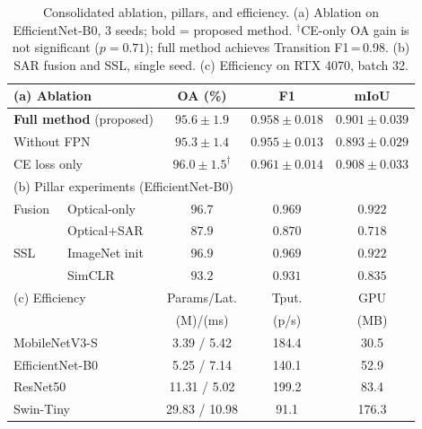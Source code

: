 \documentclass[conference]{IEEEtran}
\begin{document}
\begin{table}[!t]
\centering
\caption{Consolidated ablation, pillars, and efficiency. (a) Ablation on EfficientNet-B0, 3 seeds; bold = proposed method. $^\dagger$CE-only OA gain is not significant ($p{=}0.71$); full method achieves Transition F1\,=\,0.98. (b) SAR fusion and SSL, single seed. (c) Efficiency on RTX 4070, batch 32.}
\label{tab:combined}
\footnotesize
\begin{tabular}{@{}llccc@{}}
\toprule
\multicolumn{2}{l}{(a) Ablation} & OA (\%) & F1 & mIoU\\
\midrule
\multicolumn{2}{l}{\textbf{Full method} (proposed)} & $\mathbf{95.6 \pm 1.9}$ & $\mathbf{0.958 \pm 0.018}$ & $\mathbf{0.901 \pm 0.039}$\\
\multicolumn{2}{l}{Without FPN}        & $95.3 \pm 1.4$ & $0.955 \pm 0.013$ & $0.893 \pm 0.029$\\
\multicolumn{2}{l}{CE loss only}       & $96.0 \pm 1.5^{\dagger}$ & $0.961 \pm 0.014$ & $0.908 \pm 0.033$\\
\midrule
\multicolumn{5}{l}{(b) Pillar experiments (EfficientNet-B0)}\\
Fusion & Optical-only   & $\mathbf{96.7}$ & $\mathbf{0.969}$ & $\mathbf{0.922}$\\
       & Optical+SAR    & $87.9$ & $0.870$ & $0.718$\\
SSL    & ImageNet init  & $\mathbf{96.9}$ & $\mathbf{0.969}$ & $\mathbf{0.922}$\\
       & SimCLR         & $93.2$ & $0.931$ & $0.835$\\
\midrule
\multicolumn{2}{l}{(c) Efficiency} & Params/Lat. & Tput. & GPU\\
\multicolumn{2}{l}{} & (M)/(ms) & (p/s) & (MB)\\
\midrule
\multicolumn{2}{l}{MobileNetV3-S}  & 3.39 / 5.42  & 184.4 & 30.5\\
\multicolumn{2}{l}{EfficientNet-B0}& 5.25 / 7.14  & 140.1 & 52.9\\
\multicolumn{2}{l}{ResNet50}       & 11.31 / 5.02 & 199.2 & 83.4\\
\multicolumn{2}{l}{Swin-Tiny}      & 29.83 / 10.98 & 91.1 & 176.3\\
\bottomrule
\end{tabular}
\end{table}
\end{document}
